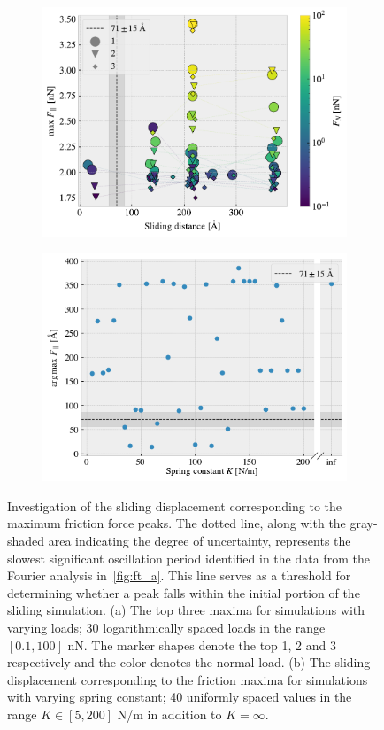 \begin{figure}[!htb]
  \centering
  \begin{subfigure}[t]{0.49\textwidth}
      \centering
      \includegraphics[width=\textwidth]{figures/baseline/max_dist.pdf}
      \caption{}
        \label{fig:max_dist}
    \end{subfigure}
    \hfill
    \begin{subfigure}[t]{0.49\textwidth}
      \centering
      \includegraphics[width=\textwidth]{figures/baseline/max_vs_K}
      \caption{}
      \label{fig:max_vs_K}
    \end{subfigure}
    \caption{Investigation of the sliding displacement corresponding to the maximum friction force peaks. The dotted line, along with the gray-shaded area indicating the degree of uncertainty, represents the slowest significant oscillation period identified in the data from the Fourier analysis in~\cref{fig:ft_a}. This line serves as a threshold for determining whether a peak falls within the initial portion of the sliding simulation. (a) The top three maxima for simulations with varying loads; 30 logarithmically spaced loads in the range $[0.1, 100]$ nN. The marker shapes denote the top 1, 2 and 3 respectively and the color denotes the normal load. (b) The sliding displacement corresponding to the friction maxima for simulations with varying spring constant; 40 uniformly spaced values in the range $K \in [5, 200]$ N/m in addition to $K = \infty$.}

\end{figure}
